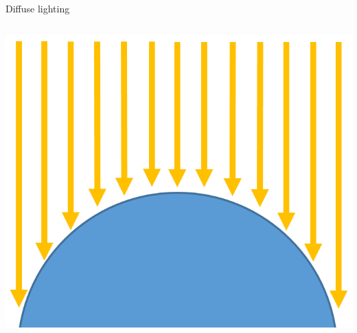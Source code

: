 \begin{frame}{Diffuse lighting}
\begin{columns}
\begin{column}{0.33\textwidth}
			\includegraphics[width=\textwidth]{diffuse_2}
		\end{column}
	\end{columns}
\end{frame}

